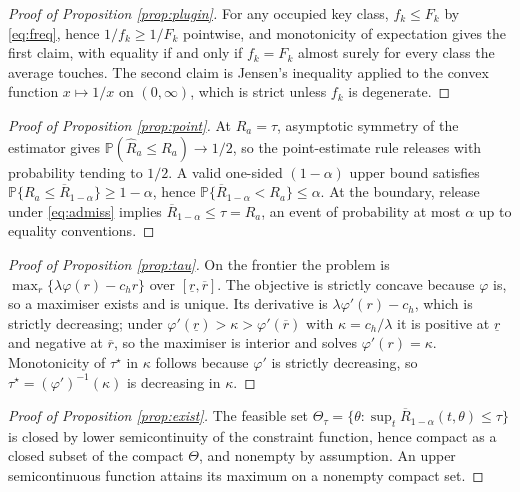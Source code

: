 \documentclass[11pt,a4paper]{article}
\theoremstyle{plain}
\theoremstyle{definition}
\newcommand{\Prob}{\mathbb{P}}
\begin{document}
\begin{proof}[Proof of Proposition \ref{prop:plugin}]
For any occupied key class, $f_k \leq F_k$ by \eqref{eq:freq}, hence $1/f_k
\geq 1/F_k$ pointwise, and monotonicity of expectation gives the first claim,
with equality if and only if $f_k = F_k$ almost surely for every class the
average touches. The second claim is Jensen's inequality applied to the convex
function $x \mapsto 1/x$ on $(0, \infty)$, which is strict unless $f_k$ is
degenerate.
\end{proof}

\begin{proof}[Proof of Proposition \ref{prop:point}]
At $R_a = \tau$, asymptotic symmetry of the estimator gives
$\Prob(\widehat{R}_a \leq R_a) \to 1/2$, so the point-estimate rule releases
with probability tending to $1/2$. A valid one-sided $(1-\alpha)$ upper bound
satisfies $\Prob\{R_a \leq \overline{R}_{1-\alpha}\} \geq 1 - \alpha$, hence
$\Prob\{\overline{R}_{1-\alpha} < R_a\} \leq \alpha$. At the boundary, release under
\eqref{eq:admiss} implies $\overline{R}_{1-\alpha} \leq \tau = R_a$, an event of
probability at most $\alpha$ up to equality conventions.
\end{proof}

\begin{proof}[Proof of Proposition \ref{prop:tau}]
On the frontier the problem is $\max_r \{\lambda\varphi(r) - c_h r\}$ over
$[\underline r, \overline r]$. The objective is strictly concave because
$\varphi$ is, so a maximiser exists and is unique. Its derivative is
$\lambda\varphi'(r) - c_h$, which is strictly decreasing; under
$\varphi'(\underline r) > \kappa > \varphi'(\overline r)$ with $\kappa = c_h /
\lambda$ it is positive at $\underline r$ and negative at $\overline r$, so the
maximiser is interior and solves $\varphi'(r) = \kappa$. Monotonicity of
$\tau^\star$ in $\kappa$ follows because $\varphi'$ is strictly decreasing, so
$\tau^\star = (\varphi')^{-1}(\kappa)$ is decreasing in $\kappa$.
\end{proof}

\begin{proof}[Proof of Proposition \ref{prop:exist}]
The feasible set $\Theta_\tau = \{\theta : \sup_{t}\overline{R}_{1-\alpha}(t,\theta) \leq
\tau\}$ is closed by lower semicontinuity of the constraint function, hence
compact as a closed subset of the compact $\Theta$, and nonempty by assumption.
An upper semicontinuous function attains its maximum on a nonempty compact set.
\end{proof}
\end{document}
